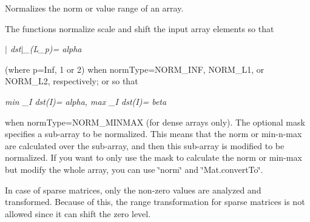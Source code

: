 Normalizes the norm or value range of an array.

The functions {\ttfamily normalize} scale and shift the input array elements so that

{\itshape $\vert$ dst$\vert$\+\_\+(L\+\_\+p)= alpha}

(where p=Inf, 1 or 2) when {\ttfamily norm\+Type=N\+O\+R\+M\+\_\+\+I\+NF}, {\ttfamily N\+O\+R\+M\+\_\+\+L1}, or {\ttfamily N\+O\+R\+M\+\_\+\+L2}, respectively; or so that

{\itshape min \+\_\+I dst(\+I)= alpha, max \+\_\+I dst(\+I)= beta}

when {\ttfamily norm\+Type=N\+O\+R\+M\+\_\+\+M\+I\+N\+M\+AX} (for dense arrays only). The optional mask specifies a sub-\/array to be normalized. This means that the norm or min-\/n-\/max are calculated over the sub-\/array, and then this sub-\/array is modified to be normalized. If you want to only use the mask to calculate the norm or min-\/max but modify the whole array, you can use \char`\"{}norm\char`\"{} and \char`\"{}\+Mat.\+convert\+To\char`\"{}.

In case of sparse matrices, only the non-\/zero values are analyzed and transformed. Because of this, the range transformation for sparse matrices is not allowed since it can shift the zero level.


